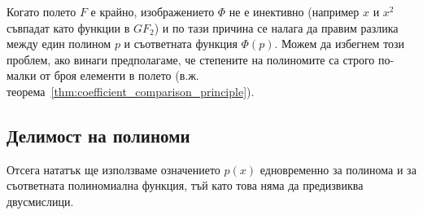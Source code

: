 \documentclass[numbers=endperiod, bibliography=totocnumbered]{scrartcl}
\begin{document}
Когато полето \( F \) е крайно, изображението \( \Phi \) не е инективно (например \( x \) и \( x^2 \) съвпадат като функции в \( GF_2 \)) и по тази причина се налага да правим разлика между един полином \( p \) и съответната функция \( \Phi(p) \). Можем да избегнем този проблем, ако винаги предполагаме, че степените на полиномите са строго по-малки от броя елементи в полето (в.ж. теорема~\ref{thm:coefficient_comparison_principle}).

\subsection{Делимост на полиноми}

Отсега нататък ще използваме означението \( p(x) \) едновременно за полинома и за съответната полиномиална функция, тъй като това няма да предизвиква двусмислици.
\end{document}
